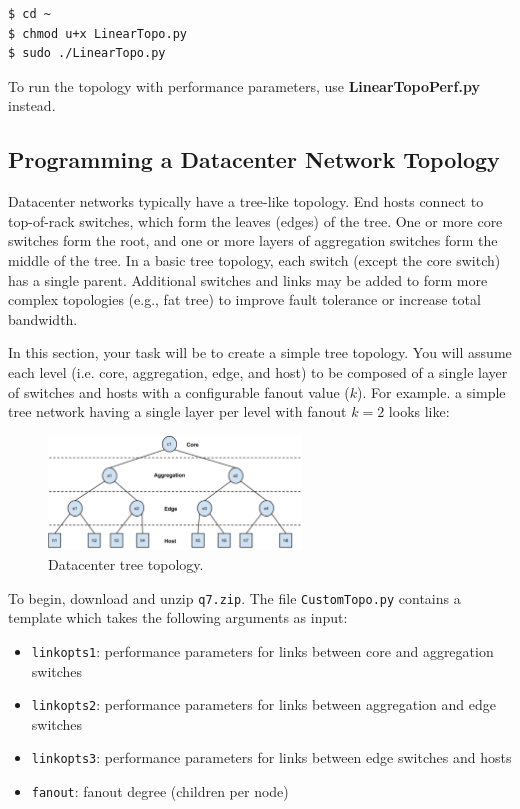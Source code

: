 \documentclass{article}
\begin{document}
\begin{topbot}
\begin{verbatim}
$ cd ~
$ chmod u+x LinearTopo.py
$ sudo ./LinearTopo.py
\end{verbatim}
\end{topbot}

\noindent
To run the topology with performance parameters, use \textbf{LinearTopoPerf.py} instead.

\subsection{Programming a Datacenter Network Topology}
Datacenter networks typically have a tree-like topology.
End hosts connect to top-of-rack switches, which form the leaves (edges) of the tree.
One or more core switches form the root, and one or more layers of aggregation switches form the middle of the tree.
In a basic tree topology, each switch (except the core switch) has a single parent.
Additional switches and links may be added to form more complex topologies (e.g., fat tree) to improve fault tolerance or increase total bandwidth.

In this section, your task will be to create a simple tree topology.
You will assume each level (i.e. core, aggregation, edge, and host) to be composed of a single layer of switches and hosts with a configurable fanout value ($k$).
For example. a simple tree network having a single layer per level with fanout $k = 2$ looks like:

\begin{figure}[H]
    \centering
    \includegraphics[width=0.6\textwidth]{img/dc_topology.png}
    \caption{Datacenter tree topology.}
    \label{fig:dc_topology}
\end{figure}

\noindent
To begin, download and unzip \texttt{q7.zip}.
The file \texttt{CustomTopo.py} contains a template which takes the following arguments as input:

\begin{itemize}
    \item \texttt{linkopts1}: performance parameters for links between core and aggregation switches
    \item \texttt{linkopts2}: performance parameters for links between aggregation and edge switches
    \item \texttt{linkopts3}: performance parameters for links between edge switches and hosts
    \item \texttt{fanout}: fanout degree (children per node)
\end{itemize}
\end{document}
